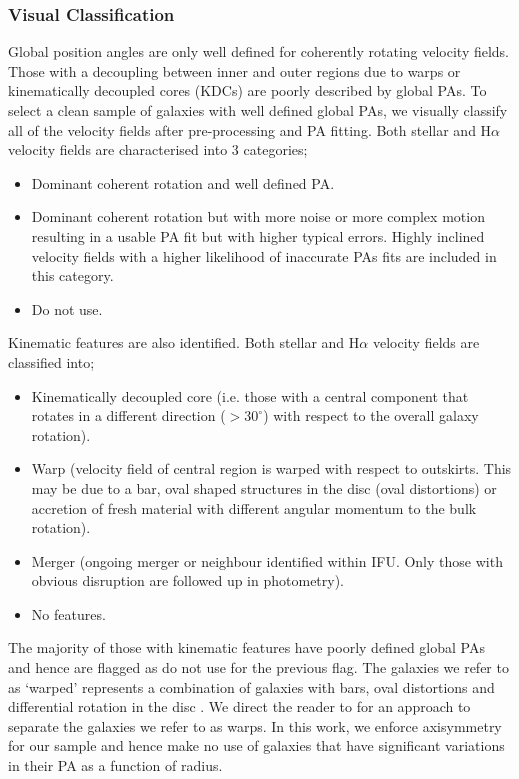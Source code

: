 \subsubsection{Visual Classification}
Global position angles are only well defined for coherently rotating velocity fields. Those with a decoupling between inner and outer regions due to warps or kinematically decoupled cores (KDCs) are poorly described by global PAs. To select a clean sample of galaxies with well defined global PAs, we visually classify all of the velocity fields after pre-processing and PA fitting. Both stellar and H$\alpha$ velocity fields are characterised into 3 categories;
\begin{itemize}
    \item Dominant coherent rotation and well defined PA.
    \item Dominant coherent rotation but with more noise or more complex motion resulting in a usable PA fit but with higher typical errors. Highly inclined velocity fields with a higher likelihood of inaccurate PAs fits are included in this category. 
    \item Do not use.
\end{itemize}

Kinematic features are also identified. Both stellar and H$\alpha$ velocity fields are classified into;
\begin{itemize}
    \item Kinematically decoupled core (i.e. those with a central component that rotates in a different direction ($> 30^{\circ}$) with respect to the overall galaxy rotation).
    \item Warp (velocity field of central region is warped with respect to outskirts. This may be due to a bar, oval shaped structures in the disc (oval distortions) or accretion of fresh material with different angular momentum to the bulk rotation).
    \item Merger (ongoing merger or neighbour identified within IFU. Only those with obvious disruption are followed up in photometry).
    \item No features.
\end{itemize}
The majority of those with kinematic features have poorly defined global PAs and hence are flagged as do not use for the previous flag. The galaxies we refer to as `warped' represents a combination of galaxies with bars, oval distortions and differential rotation in the disc \citep[e.g.][]{barrera2014}. We direct the reader to \citet{stark2018} for an approach to separate the galaxies we refer to as warps. In this work, we enforce axisymmetry for our sample and hence make no use of galaxies that have significant variations in their PA as a function of radius.

